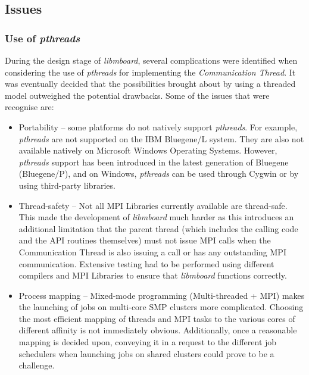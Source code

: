\subsection{Issues}

\subsubsection{Use of \textit{pthreads}}

During the design stage of \textit{libmboard}, several complications were identified when considering the use of  \textit{pthreads} for implementing the \textit{Communication Thread}. It was eventually decided that the possibilities brought about by using a threaded model  outweighed the potential drawbacks. Some of the issues that were recognise are:
\begin{itemize}
\item Portability -- some platforms do not natively support \textit{pthreads}. For example, \textit{pthreads} are not supported on the IBM Bluegene/L system. They are also not available natively on Microsoft Windows Operating Systems. However, \textit{pthreads} support has been introduced in the latest generation of Bluegene (Bluegene/P), and on Windows, \textit{pthreads} can be used through Cygwin or by using third-party libraries.
\item Thread-safety -- Not all MPI Libraries currently available are thread-safe. This made the development of \textit{libmboard} much harder as this introduces an additional limitation that the parent thread (which includes the calling code and the API routines themselves) must not issue MPI calls when the Communication Thread is also issuing a call or has any outstanding MPI communication. Extensive testing had to be performed using different compilers and MPI Libraries to ensure that \textit{libmboard} functions correctly.
\item Process mapping -- Mixed-mode programming (Multi-threaded + MPI) makes the launching of jobs on multi-core SMP clusters more complicated. Choosing the most efficient mapping of threads and MPI tasks to the various cores of different affinity is not immediately obvious. Additionally, once a reasonable mapping is decided upon, conveying it in a request to the different job schedulers when launching jobs on shared clusters could prove to be a challenge.
\end{itemize} 


